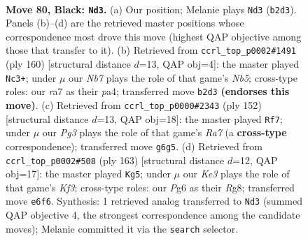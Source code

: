 \documentclass[11pt]{article}
\begin{document}
\clearpage

\begin{figure}[p]\centering
\begin{subfigure}{0.46\textwidth}\centering
\resizebox{\linewidth}{!}{%
\newchessgame
\chessboard[
  setfen={8/R7/4k1pP/5p2/5P2/8/pn4K1/8 b - - 3 80},
  showmover=false,
  pgfstyle=straightmove, color=movearrow, markmove={b2-d3}
]}
\caption{}
\end{subfigure}\hfill
\begin{subfigure}{0.46\textwidth}\centering
\resizebox{\linewidth}{!}{%
\newchessgame
\chessboard[
  setfen={1b6/6p1/2P4p/1N1k4/p5P1/5K1P/8/8 w - - 5 81},
  showmover=false,
  pgfstyle=straightmove, color=movearrow, markmove={b5-c3}
]}
\caption{}
\end{subfigure}
\\[4pt]
\begin{subfigure}{0.46\textwidth}\centering
\resizebox{\linewidth}{!}{%
\newchessgame
\chessboard[
  setfen={7k/R7/5p2/1r5P/5PK1/8/8/8 w - - 1 77},
  showmover=false,
  pgfstyle=straightmove, color=movearrow, markmove={a7-f7}
]}
\caption{}
\end{subfigure}\hfill
\begin{subfigure}{0.46\textwidth}\centering
\resizebox{\linewidth}{!}{%
\newchessgame
\chessboard[
  setfen={6r1/8/5k2/R3pp1P/8/5P1K/8/8 b - - 2 82},
  showmover=false,
  pgfstyle=straightmove, color=movearrow, markmove={f6-g5}
]}
\caption{}
\end{subfigure}
\caption{\textbf{Move 80, Black: \texttt{Nd3}.} (a) Our position; Melanie plays \texttt{Nd3} (\texttt{b2d3}). Panels (b)--(d) are the retrieved master positions whose correspondence most drove this move (highest QAP objective among those that transfer to it). (b) Retrieved from \texttt{ccrl\_top\_p0002\#1491} (ply 160) [structural distance $d$=13, QAP obj=4]: the master played \texttt{Nc3+}; under $\mu$ our \emph{Nb7} plays the role of that game's \emph{Nb5}; cross-type roles: our \emph{r}a7 as their \emph{p}a4; transferred move \texttt{b2d3} \textbf{(endorses this move)}. (c) Retrieved from \texttt{ccrl\_top\_p0000\#2343} (ply 152) [structural distance $d$=13, QAP obj=18]: the master played \texttt{Rf7}; under $\mu$ our \emph{Pg3} plays the role of that game's \emph{Ra7} (a \textbf{cross-type} correspondence); transferred move \texttt{g6g5}. (d) Retrieved from \texttt{ccrl\_top\_p0002\#508} (ply 163) [structural distance $d$=12, QAP obj=17]: the master played \texttt{Kg5}; under $\mu$ our \emph{Ke3} plays the role of that game's \emph{Kf3}; cross-type roles: our \emph{P}g6 as their \emph{R}g8; transferred move \texttt{e6f6}. Synthesis: 1 retrieved analog transferred to \texttt{Nd3} (summed QAP objective 4, the strongest correspondence among the candidate moves); Melanie committed it via the \texttt{search} selector.}
\label{fig:thought-m159}
\end{figure}
\end{document}
